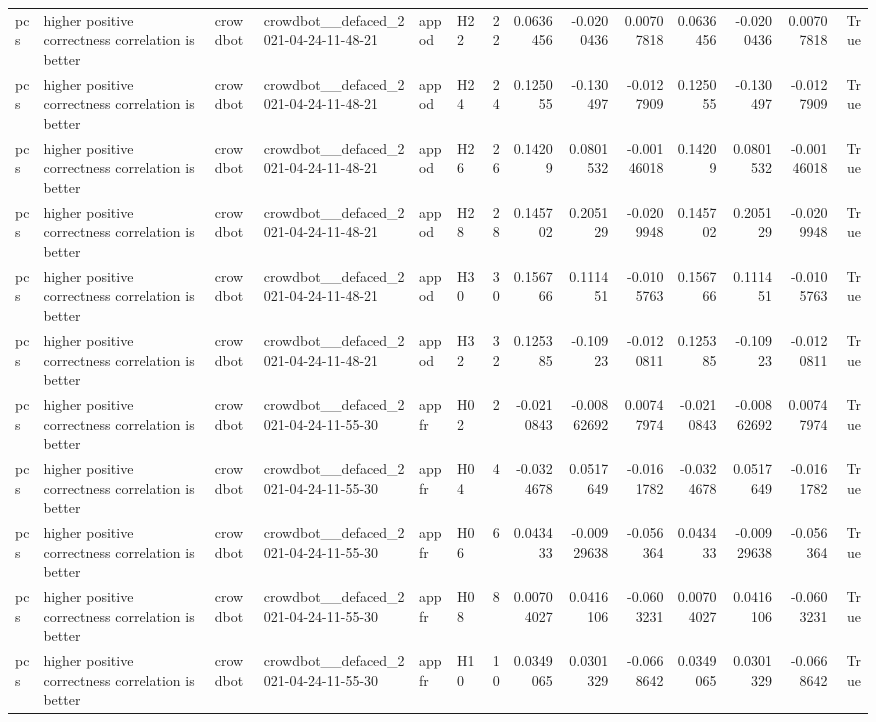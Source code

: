 \begin{longtable}{llllllrrrrrrrr}
pcs & higher positive correctness correlation is better & crowdbot & crowdbot\_\_defaced\_2021-04-24-11-48-21 & appod & H22 & 22 & 0.0636456 & -0.0200436 & 0.00707818 & 0.0636456 & -0.0200436 & 0.00707818 & True \\
pcs & higher positive correctness correlation is better & crowdbot & crowdbot\_\_defaced\_2021-04-24-11-48-21 & appod & H24 & 24 & 0.125055 & -0.130497 & -0.0127909 & 0.125055 & -0.130497 & -0.0127909 & True \\
pcs & higher positive correctness correlation is better & crowdbot & crowdbot\_\_defaced\_2021-04-24-11-48-21 & appod & H26 & 26 & 0.14209 & 0.0801532 & -0.00146018 & 0.14209 & 0.0801532 & -0.00146018 & True \\
pcs & higher positive correctness correlation is better & crowdbot & crowdbot\_\_defaced\_2021-04-24-11-48-21 & appod & H28 & 28 & 0.145702 & 0.205129 & -0.0209948 & 0.145702 & 0.205129 & -0.0209948 & True \\
pcs & higher positive correctness correlation is better & crowdbot & crowdbot\_\_defaced\_2021-04-24-11-48-21 & appod & H30 & 30 & 0.156766 & 0.111451 & -0.0105763 & 0.156766 & 0.111451 & -0.0105763 & True \\
pcs & higher positive correctness correlation is better & crowdbot & crowdbot\_\_defaced\_2021-04-24-11-48-21 & appod & H32 & 32 & 0.125385 & -0.10923 & -0.0120811 & 0.125385 & -0.10923 & -0.0120811 & True \\
pcs & higher positive correctness correlation is better & crowdbot & crowdbot\_\_defaced\_2021-04-24-11-55-30 & appfr & H02 & 2 & -0.0210843 & -0.00862692 & 0.00747974 & -0.0210843 & -0.00862692 & 0.00747974 & True \\
pcs & higher positive correctness correlation is better & crowdbot & crowdbot\_\_defaced\_2021-04-24-11-55-30 & appfr & H04 & 4 & -0.0324678 & 0.0517649 & -0.0161782 & -0.0324678 & 0.0517649 & -0.0161782 & True \\
pcs & higher positive correctness correlation is better & crowdbot & crowdbot\_\_defaced\_2021-04-24-11-55-30 & appfr & H06 & 6 & 0.043433 & -0.00929638 & -0.056364 & 0.043433 & -0.00929638 & -0.056364 & True \\
pcs & higher positive correctness correlation is better & crowdbot & crowdbot\_\_defaced\_2021-04-24-11-55-30 & appfr & H08 & 8 & 0.00704027 & 0.0416106 & -0.0603231 & 0.00704027 & 0.0416106 & -0.0603231 & True \\
pcs & higher positive correctness correlation is better & crowdbot & crowdbot\_\_defaced\_2021-04-24-11-55-30 & appfr & H10 & 10 & 0.0349065 & 0.0301329 & -0.0668642 & 0.0349065 & 0.0301329 & -0.0668642 & True \\

\end{longtable}

